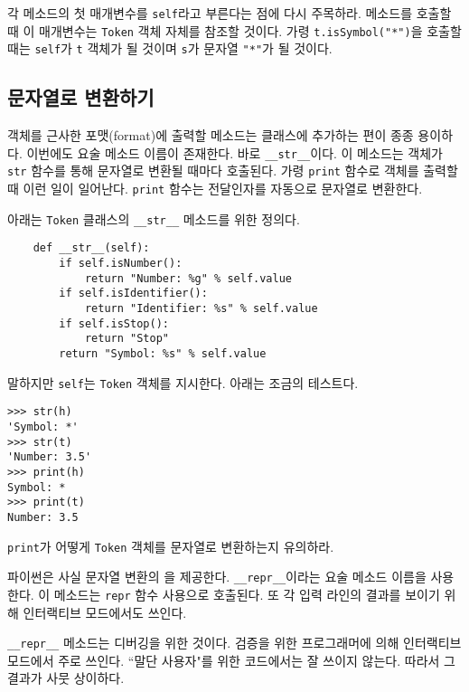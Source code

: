 \documentclass[a4paper]{oblivoir}
\begin{document}
각 메소드의 첫 매개변수를 \texttt{self}라고 부른다는 점에 다시 주목하라. 메소드를 호출할 때 이 매개변수는 \texttt{Token} 객체 자체를 참조할 것이다. 가령 \texttt{t.isSymbol("*")}을 호출할 때는 \texttt{self}가 \texttt{t} 객체가 될 것이며 \texttt{s}가 문자열 \texttt{"*"}가 될 것이다.  

\subsection*{문자열로 변환하기}

객체를 근사한 포맷(format)에 출력할 메소드는 클래스에 추가하는 편이 종종 용이하다. 이번에도 요술 메소드 이름이 존재한다. 바로 \texttt{\_\_str\_\_}이다. 이 메소드는 객체가 \texttt{str} 함수를 통해 문자열로 변환될 때마다 호출된다. 가령 \texttt{print} 함수로 객체를 출력할 때 이런 일이 일어난다. \texttt{print} 함수는 전달인자를 자동으로 문자열로 변환한다.

아래는 \texttt{Token} 클래스의 \texttt{\_\_str\_\_} 메소드를 위한 정의다.

\begin{verbatim}
    def __str__(self):
        if self.isNumber():
            return "Number: %g" % self.value
        if self.isIdentifier():
            return "Identifier: %s" % self.value
        if self.isStop():
            return "Stop"
        return "Symbol: %s" % self.value
\end{verbatim}

 말하지만 \texttt{self}는 \texttt{Token} 객체를 지시한다. 아래는 조금의 테스트다.

\begin{lstlisting}
>>> str(h)
'Symbol: *'
>>> str(t)
'Number: 3.5'
>>> print(h)
Symbol: *
>>> print(t)
Number: 3.5
\end{lstlisting}

\noindent\texttt{print}가 어떻게 \texttt{Token} 객체를 문자열로 변환하는지 유의하라.

파이썬은 사실 문자열 변환의 을 제공한다. \texttt{\_\_repr\_\_}이라는 요술 메소드 이름을 사용한다. 이 메소드는 \texttt{repr} 함수 사용으로 호출된다. 또 각 입력 라인의 결과를 보이기 위해 인터랙티브 모드에서도 쓰인다.

\texttt{\_\_repr\_\_} 메소드는 디버깅을 위한 것이다. 검증을 위한 프로그래머에 의해 인터랙티브 모드에서 주로 쓰인다. ``말단 사용자"를 위한 코드에서는 잘 쓰이지 않는다. 따라서 그 결과가 사뭇 상이하다.
\end{document}
